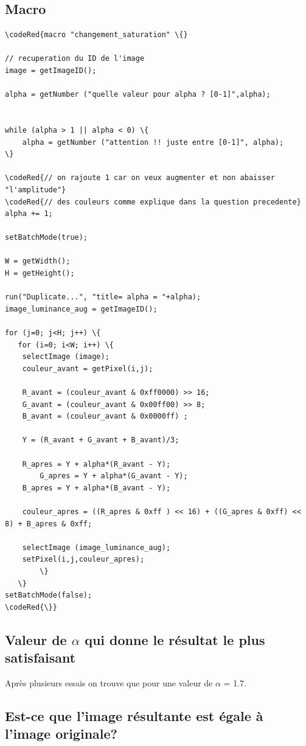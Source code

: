\documentclass[a4paper,10pt]{article}
\begin{document}
\subsection{Macro}
\begin{Verbatim}[commandchars=\\\{\}]
\codeRed{macro "changement_saturation" \{}

// recuperation du ID de l'image
image = getImageID();

alpha = getNumber ("quelle valeur pour alpha ? [0-1]",alpha);


while (alpha > 1 || alpha < 0) \{
	alpha = getNumber ("attention !! juste entre [0-1]", alpha);
\}

\codeRed{// on rajoute 1 car on veux augmenter et non abaisser "l'amplitude"}
\codeRed{// des couleurs comme explique dans la question precedente}
alpha += 1;

setBatchMode(true);

W = getWidth();
H = getHeight();

run("Duplicate...", "title= alpha = "+alpha);
image_luminance_aug = getImageID();

for (j=0; j<H; j++) \{
   for (i=0; i<W; i++) \{
	selectImage (image);
	couleur_avant = getPixel(i,j);

	R_avant = (couleur_avant & 0xff0000) >> 16;
	G_avant = (couleur_avant & 0x00ff00) >> 8;
	B_avant = (couleur_avant & 0x0000ff) ;

	Y = (R_avant + G_avant + B_avant)/3;
	
	R_apres = Y + alpha*(R_avant - Y);
        G_apres = Y + alpha*(G_avant - Y);
	B_apres = Y + alpha*(B_avant - Y);

	couleur_apres = ((R_apres & 0xff ) << 16) + ((G_apres & 0xff) << 8) + B_apres & 0xff;

	selectImage (image_luminance_aug);
	setPixel(i,j,couleur_apres);
      	\}
   \}
setBatchMode(false);
\codeRed{\}}
\end{Verbatim}

\subsection{Valeur de $\alpha$ qui donne le r\'esultat le plus satisfaisant}

Apr\`es plusieurs essais on trouve que pour une valeur de $\alpha$ = 1.7.

\subsection{Est-ce que l'image r\'esultante est \'egale \`a l'image originale?}
\end{document}
